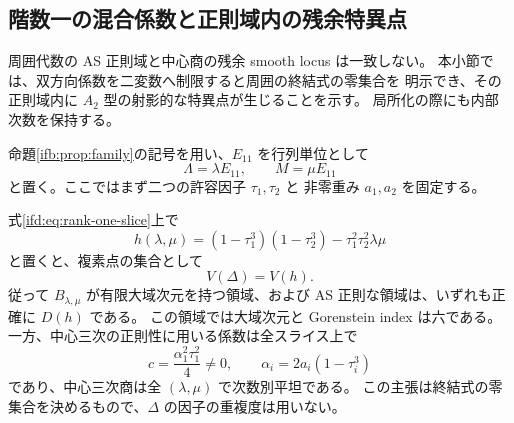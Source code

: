 \subsection{階数一の混合係数と正則域内の残余特異点}
\label{ifd:subsec:rank-one}

周囲代数の AS 正則域と中心商の残余 smooth locus は一致しない。
本小節では、双方向係数を二変数へ制限すると周囲の終結式の零集合を
明示でき、その正則域内に $A_2$ 型の射影的な特異点が生じることを示す。
局所化の際にも内部次数を保持する。

命題\ref{ifb:prop:family}の記号を用い、$E_{11}$ を行列単位として
\begin{equation}\label{ifd:eq:rank-one-slice}
       \Lambda=\lambda E_{11},\qquad M=\mu E_{11}
\end{equation}
と置く。ここではまず二つの許容因子 $\tau_1,\tau_2$ と
非零重み $a_1,a_2$ を固定する。

\begin{proposition}[階数一スライスの厳密な周囲正則域]
\label{ifd:prop:ambient-locus}
式\eqref{ifd:eq:rank-one-slice}上で
\begin{equation}\label{ifd:eq:ambient-hyperbola}
 h(\lambda,\mu)=(1-\tau_1^3)(1-\tau_2^3)
                         -\tau_1^2\tau_2^2\lambda\mu
\end{equation}
と置くと、複素点の集合として
\[
       V(\Delta)=V(h).
\]
従って $B_{\lambda,\mu}$ が有限大域次元を持つ領域、および
AS 正則な領域は、いずれも正確に $D(h)$ である。
この領域では大域次元と Gorenstein index は六である。
一方、中心三次の正則性に用いる係数は全スライス上で
\begin{equation}\label{ifd:eq:central-unit}
       c=\frac{\alpha_1^2\tau_1^2}{4}\ne0,
       \qquad \alpha_i=2a_i(1-\tau_i^3)
\end{equation}
であり、中心三次商は全 $(\lambda,\mu)$ で次数別平坦である。
この主張は終結式の零集合を決めるもので、$\Delta$ の因子の重複度は用いない。
\end{proposition}

